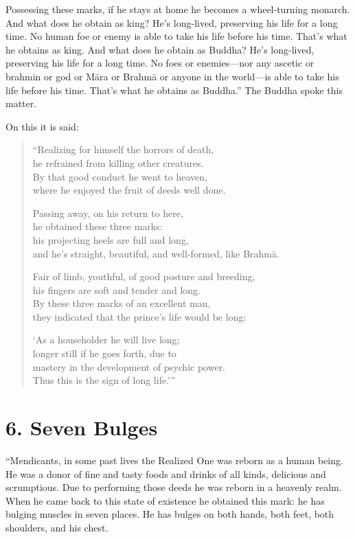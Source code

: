 \documentclass[12pt,openany]{book}%
\begin{document}
Possessing these marks, if he stays at home he becomes a wheel-turning monarch. And what does he obtain as king? He’s long-lived, preserving his life for a long time. No human foe or enemy is able to take his life before his time. That’s what he obtains as king. And what does he obtain as Buddha? He’s long-lived, preserving his life for a long time. No foes or enemies—nor any ascetic or brahmin or god or \textsanskrit{Māra} or \textsanskrit{Brahmā} or anyone in the world—is able to take his life before his time. That’s what he obtains as Buddha.” The Buddha spoke this matter. 

On this it is said: 

\begin{verse}%
“Realizing for himself the horrors of death, \\
he refrained from killing other creatures. \\
By that good conduct he went to heaven, \\
where he enjoyed the fruit of deeds well done. 

Passing away, on his return to here, \\
he obtained these three marks: \\
his projecting heels are full and long, \\
and he’s straight, beautiful, and well-formed, like \textsanskrit{Brahmā}. 

Fair of limb, youthful, of good posture and breeding, \\
his fingers are soft and tender and long. \\
By these three marks of an excellent man, \\
they indicated that the prince’s life would be long: 

‘As a householder he will live long; \\
longer still if he goes forth, due to \\
mastery in the development of psychic power. \\
Thus this is the sign of long life.’” 

%
\end{verse}

\section*{6. Seven Bulges }

“Mendicants, in some past lives the Realized One was reborn as a human being. He was a donor of fine and tasty foods and drinks of all kinds, delicious and scrumptious. Due to performing those deeds he was reborn in a heavenly realm. When he came back to this state of existence he obtained this mark: he has bulging muscles in seven places. He has bulges on both hands, both feet, both shoulders, and his chest. 
\end{document}
